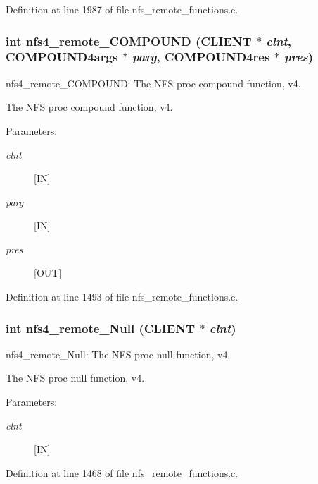 Definition at line 1987 of file nfs\_\-remote\_\-functions.c.
\subsubsection[{nfs4\_\-remote\_\-COMPOUND}]{\setlength{\rightskip}{0pt plus 5cm}int nfs4\_\-remote\_\-COMPOUND (CLIENT $\ast$ {\em clnt}, \/  COMPOUND4args $\ast$ {\em parg}, \/  COMPOUND4res $\ast$ {\em pres})}\label{group__NFSprocs_g48b01a768677c14f9e3ba0899b420973}


nfs4\_\-remote\_\-COMPOUND: The NFS proc compound function, v4.

The NFS proc compound function, v4.

\begin{Desc}
\item[Parameters:]
\begin{description}
\item[{\em clnt}][IN] \item[{\em parg}][IN] \item[{\em pres}][OUT] \end{description}
\end{Desc}


Definition at line 1493 of file nfs\_\-remote\_\-functions.c.
\subsubsection[{nfs4\_\-remote\_\-Null}]{\setlength{\rightskip}{0pt plus 5cm}int nfs4\_\-remote\_\-Null (CLIENT $\ast$ {\em clnt})}\label{group__NFSprocs_gafde9fd4cee9adced32a2c72237fbf1b}


nfs4\_\-remote\_\-Null: The NFS proc null function, v4.

The NFS proc null function, v4.

\begin{Desc}
\item[Parameters:]
\begin{description}
\item[{\em clnt}][IN] \end{description}
\end{Desc}


Definition at line 1468 of file nfs\_\-remote\_\-functions.c.